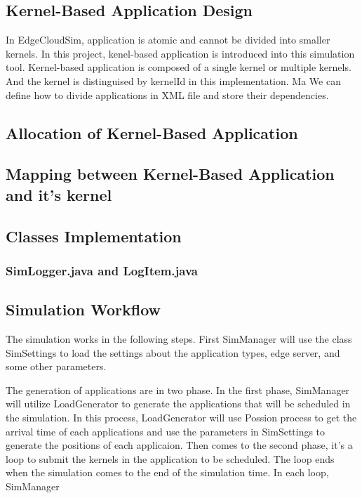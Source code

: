 \subsection{Kernel-Based Application Design}
In EdgeCloudSim, application is atomic and cannot be divided into smaller kernels. In this project, kenel-based application is introduced into this simulation tool. Kernel-based application is composed of a single kernel or multiple kernels. And the kernel is distinguised by kernelId in this implementation. 
Ma
We can define how to divide applications in XML file and store their dependencies.


\subsection{Allocation of Kernel-Based Application}


\subsection{Mapping between Kernel-Based Application and it's kernel}


\subsection{Classes Implementation}

\subsubsection{SimLogger.java and LogItem.java}



\subsection{Simulation Workflow}
The simulation works in the following steps. First SimManager will use the class SimSettings to load the settings about the application types, edge server, and some other parameters. 

The generation of applications are in two phase. In the first phase, SimManager will utilize LoadGenerator to generate the applications that will be scheduled in the simulation. In this process, LoadGenerator will use Possion process to get the arrival time of each applications and use the parameters in SimSettings to generate the positions of each applicaion. Then comes to the second phase, it's a loop to submit the kernels in the application to be scheduled. The loop ends when the simulation comes to the end of the simulation time. In each loop, SimManager

